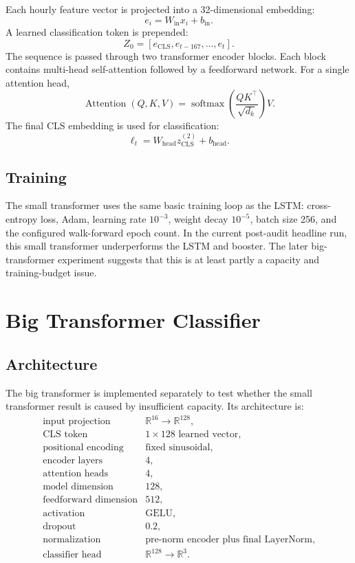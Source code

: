 \documentclass[11pt]{article}
\begin{document}
Each hourly feature vector is projected into a 32-dimensional embedding:
\[
e_i = W_{\text{in}}x_i + b_{\text{in}}.
\]
A learned classification token is prepended:
\[
Z_0 = [e_{\text{CLS}}, e_{t-167}, \ldots, e_t].
\]
The sequence is passed through two transformer encoder blocks. Each block
contains multi-head self-attention followed by a feedforward network. For a
single attention head,
\[
\operatorname{Attention}(Q,K,V)
=
\operatorname{softmax}\left(\frac{QK^\top}{\sqrt{d_k}}\right)V.
\]
The final CLS embedding is used for classification:
\[
\ell_t = W_{\text{head}} z_{\text{CLS}}^{(2)} + b_{\text{head}}.
\]

\subsection{Training}

The small transformer uses the same basic training loop as the LSTM:
cross-entropy loss, Adam, learning rate \(10^{-3}\), weight decay \(10^{-5}\),
batch size 256, and the configured walk-forward epoch count. In the current
post-audit headline run, this small transformer underperforms the LSTM and
booster. The later big-transformer experiment suggests that this is at least
partly a capacity and training-budget issue.

\section{Big Transformer Classifier}

\subsection{Architecture}

The big transformer is implemented separately to test whether the small
transformer result is caused by insufficient capacity. Its architecture is:
\[
\begin{array}{ll}
\text{input projection} & \mathbb{R}^{16} \rightarrow \mathbb{R}^{128},\\
\text{CLS token} & 1 \times 128 \text{ learned vector},\\
\text{positional encoding} & \text{fixed sinusoidal},\\
\text{encoder layers} & 4,\\
\text{attention heads} & 4,\\
\text{model dimension} & 128,\\
\text{feedforward dimension} & 512,\\
\text{activation} & \text{GELU},\\
\text{dropout} & 0.2,\\
\text{normalization} & \text{pre-norm encoder plus final LayerNorm},\\
\text{classifier head} & \mathbb{R}^{128} \rightarrow \mathbb{R}^{3}.
\end{array}
\]
\end{document}
